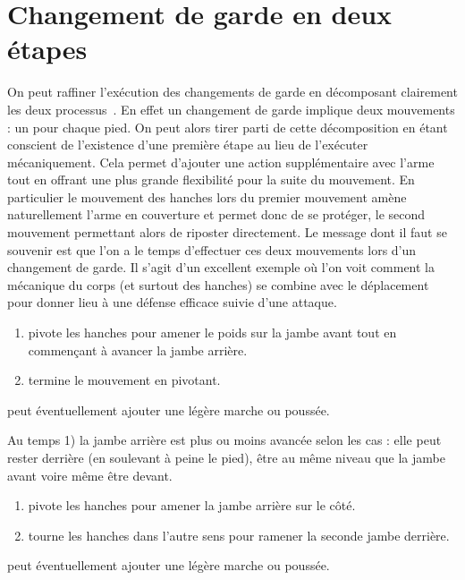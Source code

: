 \section{Changement de garde en deux étapes}


\label{def:texte:garde-kung-fu}
On peut raffiner l'exécution des changements de garde en décomposant clairement les deux processus~\footnotemark{}.
En effet un changement de garde implique deux mouvements : un pour chaque pied.
On peut alors tirer parti de cette décomposition en étant conscient de l'existence d'une première étape au lieu de l'exécuter mécaniquement.
Cela permet d'ajouter une action supplémentaire avec l'arme tout en offrant une plus grande flexibilité pour la suite du mouvement.
En particulier le mouvement des hanches lors du premier mouvement amène naturellement l'arme en couverture et permet donc de se protéger, le second mouvement permettant alors de riposter directement.
Le message dont il faut se souvenir est que l'on a le temps d'effectuer ces deux mouvements lors d'un changement de garde.
Il s'agit d'un excellent exemple où l'on voit comment la mécanique du corps (et surtout des hanches) se combine avec le déplacement pour donner lieu à une défense efficace suivie d'une attaque.

\begin{technique}
	\label{att:tech:changement-garde-2-temps-avant}

	\begin{enumerate}
		\item \A pivote les hanches pour amener le poids sur la jambe avant tout en commençant à avancer la jambe arrière.
		
		\item \A termine le mouvement en pivotant.
	\end{enumerate}

	\A peut éventuellement ajouter une légère marche ou poussée.

	Au temps 1) la jambe arrière est plus ou moins avancée selon les cas : elle peut rester derrière (en soulevant à peine le pied), être au même niveau que la jambe avant voire même être devant.
\end{technique}


\begin{technique}
	\label{att:tech:changement-garde-2-temps-latéral}

	\begin{enumerate}
		\item \A pivote les hanches pour amener la jambe arrière sur le côté.
		
		\item \A tourne les hanches dans l'autre sens pour ramener la seconde jambe derrière.
	\end{enumerate}

	\A peut éventuellement ajouter une légère marche ou poussée.
\end{technique}


